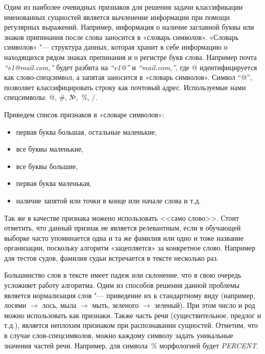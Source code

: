 \documentclass{csmathnotes}
\begin{document}
Одим из наиболее очевидных признаков для решения задачи классификации именованных сущностей является вычленение информации при помощи регулярных выражений. Например, информация о наличие заглавной буквы или знаков припинания после слова заносится в  «словарь символов». «Словарь символов» "--- структура данных, которая хранит в себе информацию о находящихся рядом знаках препинания и о регистре букв слова.
Например почта \emph{“v1@mail.com,”} будет разбита на \emph{“v1@”} и \emph{“mail.com,”}, где @ идентифицируется как слово-спецсимвол, а запятая заносится в «словарь символов». Символ “@”, позволяет классифицировать строку как почтовый адрес. Используемые нами спецсимволы: @, \#, №,~\%, $/$.


Приведем список признаков в «словаре символов»:
\begin{itemize}
    \item первая буква большая, остальные маленькие,
    \item все буквы маленькие,
    \item все буквы большие,
    \item первая буква маленькая,
    \item наличие запятой или точки в конце или начале слова и т.д.
\end{itemize}


Так же в качестве признака можено использовать <<само слово>>. Стоит отметить, что данный признак не является релевантным, если в обучающей выборке часто упоминается одна и та же фамилия или одно и тоже название организации, поскольку алгоритм «зацепляется» за конкретное слово.
Например для тестов судов, фамилия судьи встречается в тексте несколько раз.


Большинство слов в тексте имеет падеж или склонение, что в свою очередь усложняет работу алгоритма.
Одим из способов решения данной проблемы является нормализация слов "--- приведение их к стандартному виду
(например, лосями $\rightarrow$  лось, мыла $\rightarrow$ мыть, зеленого $\rightarrow$ зеленый).
При этом число и род можно использовать как признаки.
Также часть речи (существительное, предлог и т.д.), является неплохим признаком при распознавании сущностей.
Отметим, что в случае слов-спецсимволов, можно каждому символу задать уникальные значения частей речи.
Например, для символа~\% морфологией будет \emph{PERCENT}.
\end{document}
